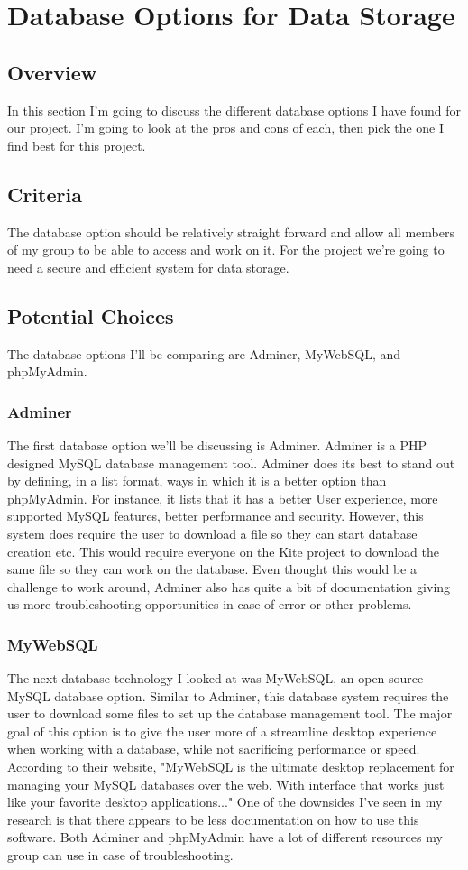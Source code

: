 \documentclass[compsoc, 10, draftclsnofoot, onecolumn]{IEEEtran}
\begin{document}
\section{\textbf{Database Options for Data Storage}}
\subsection{Overview} In this section I'm going to discuss the different database options I have found for our project. I'm going to look at the pros and cons of each, then pick the one I find best for this project. 
\subsection{Criteria} The database option should be relatively straight forward and allow all members of my group to be able to access and work on it. For the project we're going to need a secure and efficient system for data storage.
\subsection{Potential Choices} The database options I'll be comparing are Adminer, MyWebSQL, and phpMyAdmin.
\subsubsection{Adminer}
The first database option we'll be discussing is Adminer. Adminer is a PHP designed MySQL database management tool. Adminer does its best to stand out by defining, in a list format, ways in which it is a better option than phpMyAdmin. For instance, it lists that it has a better User experience, more supported MySQL features, better performance and security\cite{r1}. However, this system does require the user to download a file so they can start database creation etc. This would require everyone on the Kite project to download the same file so they can work on the database. Even thought this would be a challenge to work around, Adminer also has quite a bit of documentation giving us more troubleshooting opportunities in case of error or other problems.
\subsubsection{MyWebSQL}
\indent The next database technology I looked at was MyWebSQL, an open source MySQL database option. Similar to Adminer, this database system requires the user to download some files to set up the database management tool. The major goal of this option is to give the user more of a streamline desktop experience when working with a database, while not sacrificing performance or speed. According to their website, "MyWebSQL is the ultimate desktop replacement for managing your MySQL databases over the web. With interface that works just like your favorite desktop applications...\cite{r2}" One of the downsides I've seen in my research is that there appears to be less documentation on how to use this software. Both Adminer and phpMyAdmin have a lot of different resources my group can use in case of troubleshooting.  
\end{document}
